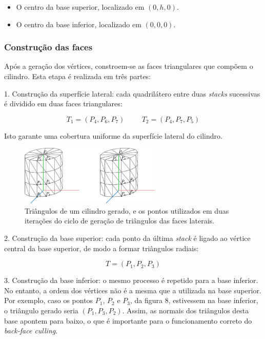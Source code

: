 \documentclass[12pt, a4paper]{article}
\begin{document}
\begin{itemize}
    \item O centro da base superior, localizado em $(0, h, 0)$.
    \item O centro da base inferior, localizado em $(0, 0, 0)$.
\end{itemize}

\subsubsection{Construção das faces}

Após a geração dos vértices, constroem-se as faces triangulares que compõem o cilindro. Esta etapa
é realizada em três partes:

1. Construção da superfície lateral: cada quadrilátero entre duas \emph{stacks} sucessivas é
dividido em duas faces triangulares:

$$
T_1 = (P_4, P_6, P_7)
\hspace{1cm}
T_2 = (P_4, P_7, P_5)
$$

Isto garante uma cobertura uniforme da superfície lateral do cilindro.

\begin{figure}[H]
    \centering
    \includegraphics[width=0.6\textwidth]{res/phase1/figures/cylinder.pdf}
    \caption{
        \onehalfspacing
        Triângulos de um cilindro gerado, e os pontos utilizados em duas iterações do ciclo de
        geração de triângulos das faces laterais.
    }
\end{figure}

2. Construção da base superior: cada ponto da última \emph{stack} é ligado ao vértice central da
base superior, de modo a formar triângulos radiais:

$$
T = (P_1, P_2, P_3)
$$

3. Construção da base inferior: o mesmo processo é repetido para a base inferior. No entanto, a
ordem dos vértices não é a mesma que a utilizada na base superior. Por exemplo, caso os pontos
$P_1$, $P_2$ e $P_3$, da figura 8, estivessem na base inferior, o triângulo gerado seria
$(P_1, P_3, P_2)$. Assim, as normais dos triângulos desta base apontem para baixo, o que é
importante para o funcionamento correto do \emph{back-face culling}.
\end{document}
